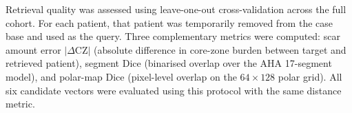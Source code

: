 Retrieval quality was assessed using leave-one-out cross-validation across the full cohort.
For each patient, that patient was temporarily removed from the case base and used as the
query. Three complementary metrics were computed: scar amount error $|\Delta\text{CZ}|$
(absolute difference in core-zone burden between target and retrieved patient), segment
Dice (binarised overlap over the AHA 17-segment model), and polar-map Dice (pixel-level
overlap on the $64 \times 128$ polar grid). All six candidate vectors were evaluated using this
protocol with the same distance metric.
